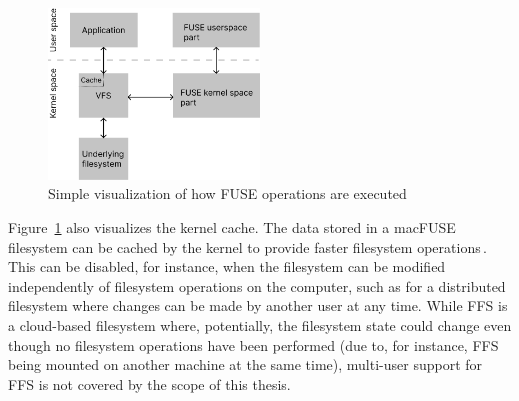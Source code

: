 \begin{figure}[!ht]
	\begin{center}
	  \includegraphics[width=0.5\textwidth]{figures/fuse_description.png}
	\end{center}
	\caption{Simple visualization of how \gls{FUSE} operations are executed}
	\label{fig:fuse_desc}
\end{figure}

Figure~\ref{fig:fuse_desc} also visualizes the kernel cache. The data stored in a macFUSE filesystem can be cached by the kernel to provide faster filesystem operations\,\cite{vangoorFUSENotFUSE2017, fleischerMountOptionsOsxfuse2020, gowdappaExperiencesFUSEReal2019}. This can be disabled, for instance, when the filesystem can be modified independently of filesystem operations on the computer, such as for a distributed filesystem where changes can be made by another user at any time. While \gls{FFS} is a \mbox{cloud-based} filesystem where, potentially, the filesystem state could change even though no filesystem operations have been performed (due to, for instance, \gls{FFS} being mounted on another machine at the same time), multi-user support for \gls{FFS} is not covered by the scope of this thesis.
